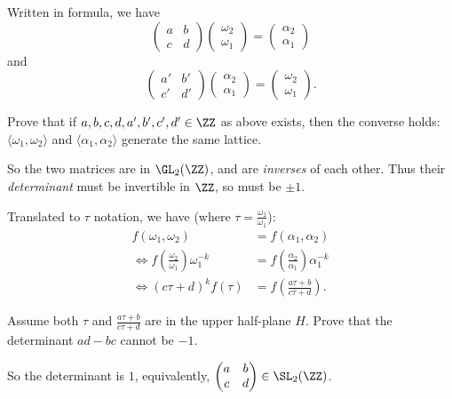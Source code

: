 Written in formula, we have
\[ \begin{pmatrix} a&b \\ c&d \end{pmatrix} \begin{pmatrix} \omega_2 \\ \omega_1 \end{pmatrix}
= \begin{pmatrix} \alpha_2 \\ \alpha_1 \end{pmatrix} \]
and
\[ \begin{pmatrix} a'&b' \\ c'&d' \end{pmatrix} \begin{pmatrix} \alpha_2 \\ \alpha_1 \end{pmatrix}
= \begin{pmatrix} \omega_2 \\ \omega_1 \end{pmatrix}. \]

\begin{exercise}
	Prove that if $a, b, c, d, a', b', c', d' \in \ZZ$ as above exists, then the converse holds:
	$\langle \omega_1, \omega_2 \rangle$ and $\langle \alpha_1, \alpha_2 \rangle$
	generate the same lattice.
\end{exercise}

So the two matrices are in $\GL_2(\ZZ)$, and are \emph{inverses} of each other.
Thus their \emph{determinant} must be invertible in $\ZZ$, so must be $\pm 1$.

Translated to $\tau$ notation, we have (where $\tau = \frac{\omega_2}{\omega_1}$):
\begin{align*}
	f(\omega_1, \omega_2) &= f(\alpha_1, \alpha_2) \\
	\iff f\left(\frac{\omega_2}{\omega_1}\right) \omega_1^{-k}
						  &= f\left(\frac{\alpha_2}{\alpha_1}\right) \alpha_1^{-k} \\
	\iff (c \tau+d)^k f(\tau) &= f\left(\frac{a \tau+b}{c \tau+d}\right).
\end{align*}

\begin{exercise}
	Assume both $\tau$ and $\frac{a \tau+b}{c \tau+d}$ are in the upper half-plane $H$.
	Prove that the determinant $ad-bc$ cannot be $-1$.
\end{exercise}

So the determinant is $1$, equivalently,
$\begin{pmatrix} a&b \\ c&d \end{pmatrix} \in \SL_2(\ZZ)$.

